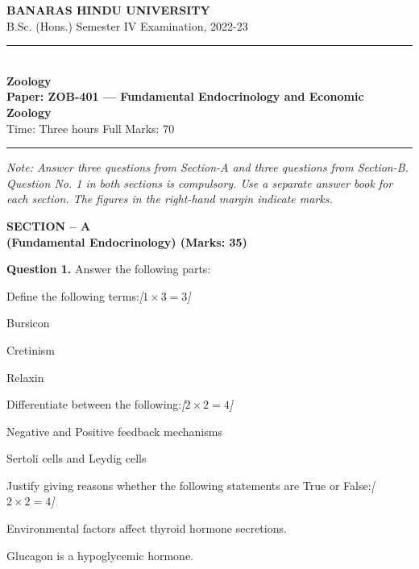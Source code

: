 \documentclass[11pt,a4paper]{article}
\newcommand{\pts}[1]{\hfill   \textit{[#1]}}
\begin{document}
\begin{center}
  {\large\bfseries BANARAS HINDU UNIVERSITY}\\[2pt]
  {\normalsize B.Sc. (Hons.) Semester IV Examination, 2022-23}\\[6pt]
  \rule{0.8\linewidth}{0.5pt}\\[6pt]
  {\large\bfseries Zoology}\\[4pt]
  {\large\bfseries Paper: ZOB-401 --- Fundamental Endocrinology and Economic Zoology}\\[4pt]
  {\normalsize Time: Three hours \hfill Full Marks: 70}
\end{center}

\rule{\linewidth}{0.4pt}

\smallskip



\noindent   \textit{Note: Answer three questions from Section-A and three questions from Section-B. Question No. 1 in both sections is compulsory. Use a separate answer book for each section. The figures in the right-hand margin indicate marks.}

\bigskip

\begin{center}
   \textbf{SECTION -- A} \\
   \textbf{(Fundamental Endocrinology) (Marks: 35)}
\end{center}

\medskip


\noindent   \textbf{Question 1.} Answer the following parts:

\begin{parts}
  \item Define the following terms:\pts{$1  \times 3 = 3$}
  
\begin{parts}
    \item Bursicon
    \item Cretinism
    \item Relaxin
  \end{parts}

  \item Differentiate between the following:\pts{$2  \times 2 = 4$}
  
\begin{parts}
    \item Negative and Positive feedback mechanisms
    \item Sertoli cells and Leydig cells
  \end{parts}

  \item Justify giving reasons whether the following statements are True or False:\pts{$2  \times 2 = 4$}
  
\begin{parts}
    \item Environmental factors affect thyroid hormone secretions.
    \item Glucagon is a hypoglycemic hormone.
  \end{parts}
\end{parts}
\end{document}
